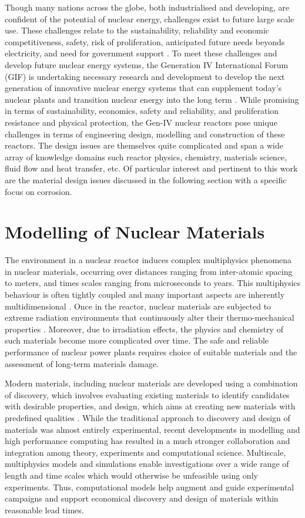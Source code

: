 	Though many nations across the globe, both industrialised and developing, are confident of the potential of nuclear energy, challenges exist to future large scale use. These challenges relate to the sustainability, reliability and economic competitiveness, safety, risk of proliferation, anticipated future needs beyonds electricity, and need for government support \cite{GIF:2009aa}. To meet these challenges and develop future nuclear energy systems, the Generation {IV} International Forum (GIF) is undertaking necessary research and development to develop the next generation of innovative nuclear energy systems that can supplement today's nuclear plants and transition nuclear energy into the long term \cite{GIF:2019aa}. While promising in terms of sustainability, economics, safety and reliability, and proliferation resistance and physical protection, the Gen-{IV} nuclear reactors pose unique challenges in terms of engineering design, modelling and construction of these reactors. The design issues are themselves quite complicated and span a wide array of knowledge domains such reactor physics, chemistry, materials science, fluid flow and heat transfer, etc. Of particular interest and pertinent to this work are the material design issues discussed in the following section with a specific focus on corrosion.

\section{Modelling of Nuclear Materials}
	The environment in a nuclear reactor induces complex multiphysics phenomena in nuclear materials, occurring over distances ranging from inter-atomic spacing to meters, and times scales ranging from microseconds to years. This multiphysics behaviour is often tightly coupled and many important aspects are inherently multidimensional  \cite{WILLIAMSON2012149}. Once in the reactor, nuclear materials are subjected to extreme radiation environments that continuously alter their thermo-mechanical properties \cite{STAN200920}. Moreover, due to irradiation effects, the physics and chemistry of such materials become more complicated over time. The safe and reliable performance of nuclear power plants requires choice of suitable materials and the assessment of long-term materials damage.

	Modern materials, including nuclear materials are developed using a combination of discovery, which involves evaluating existing materials to identify candidates with desirable properties, and design, which aims at  creating new materials with predefined qualities \cite{STAN200920}. While the traditional approach to discovery and design of materials was almost entirely experimental, recent developments in modelling and high performance computing has resulted in a much stronger collaboration and integration among theory, experiments and computational science. Multiscale, multiphysics models and simulations enable investigations over  a wide range of length and time scales which would otherwise be unfeasible using only experiments. Thus, computational models help augment and guide experimental campaigns and support economical discovery and design of materials within reasonable lead times.

